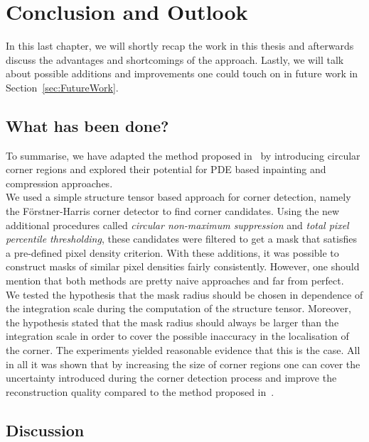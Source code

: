 \chapter{Conclusion and Outlook}\label{ch:Conclusion}

In this last chapter, we will shortly recap the work in this thesis and afterwards discuss the
advantages and shortcomings of the approach.
Lastly, we will talk about possible additions and improvements one could touch on in future work in Section~\ref{sec:FutureWork}.

\section{What has been done?}

To summarise, we have adapted the method proposed in~\cite{zimmer07} by introducing circular corner
regions and explored their potential for PDE based inpainting and compression approaches.\\
We used a simple structure tensor based approach for corner detection, namely the Förstner-Harris
corner detector to find corner candidates. Using the new additional procedures called
\textit{circular non-maximum suppression} and \textit{total pixel percentile thresholding}, these
candidates were filtered to get a mask that satisfies a pre-defined pixel density criterion. With
these additions, it was possible to construct masks of similar pixel densities fairly consistently.
However, one should mention that both methods are pretty naive approaches and far from perfect.\\
We tested the hypothesis that the mask radius should be chosen in dependence of the integration
scale during the computation of the structure tensor. Moreover, the hypothesis stated that the mask
radius should always be larger than the integration scale in order to cover the possible inaccuracy
in the localisation of the corner. The experiments yielded reasonable evidence that this is the
case. 
All in all it was shown that by increasing the size of corner regions one can cover the uncertainty
introduced during the corner detection process and improve the reconstruction quality compared to
the method proposed in~\cite{zimmer07}.

\section{Discussion}

